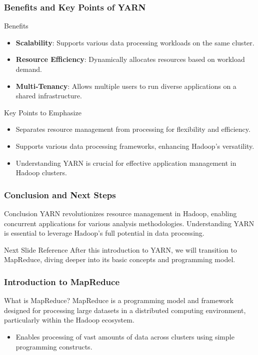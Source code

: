 \documentclass[aspectratio=169]{beamer}
\begin{document}
\begin{frame}[fragile]
    \frametitle{Benefits and Key Points of YARN}
    \begin{block}{Benefits}
        \begin{itemize}
            \item \textbf{Scalability}: Supports various data processing workloads on the same cluster.
            \item \textbf{Resource Efficiency}: Dynamically allocates resources based on workload demand.
            \item \textbf{Multi-Tenancy}: Allows multiple users to run diverse applications on a shared infrastructure.
        \end{itemize}
    \end{block}

    \begin{block}{Key Points to Emphasize}
        \begin{itemize}
            \item Separates resource management from processing for flexibility and efficiency.
            \item Supports various data processing frameworks, enhancing Hadoop's versatility.
            \item Understanding YARN is crucial for effective application management in Hadoop clusters.
        \end{itemize}
    \end{block}
\end{frame}

\begin{frame}[fragile]
    \frametitle{Conclusion and Next Steps}
    \begin{block}{Conclusion}
        YARN revolutionizes resource management in Hadoop, enabling concurrent applications for various analysis methodologies.
        Understanding YARN is essential to leverage Hadoop's full potential in data processing.
    \end{block}
    
    \begin{block}{Next Slide Reference}
        After this introduction to YARN, we will transition to MapReduce, diving deeper into its basic concepts and programming model.
    \end{block}
\end{frame}

\begin{frame}[fragile]
    \frametitle{Introduction to MapReduce}
    \begin{block}{What is MapReduce?}
        MapReduce is a programming model and framework designed for processing large datasets in a distributed computing environment, particularly within the Hadoop ecosystem.
    \end{block}
    \begin{itemize}
        \item Enables processing of vast amounts of data across clusters using simple programming constructs.
    \end{itemize}
\end{frame}
\end{document}
